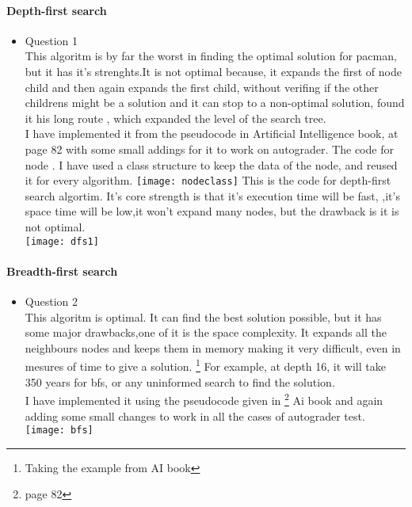 \newcommand\tab[1][1cm]{\hspace*{#1}}
\graphicspath{ {images/} }
\paragraph{Depth-first search}

\begin{itemize}
\item{Question 1}\\
	\tab This algoritm is by far the worst in finding the optimal solution for pacman, but it has it's strenghts.It is not optimal because, it expands the first of node child and then again expands the first child, without verifing if the other childrens might be a solution and it can stop to a non-optimal solution, found it his long route , which expanded the level of the search tree.\\
	\tab I have implemented it from the pseudocode in Artificial Intelligence book, at page 82 with some small addings for it to work on autograder. The code for node . I have used a class structure to keep the data of the node, and reused it for every algorithm.
\texttt{[image: nodeclass]}
	\tab This is the code for depth-first search algortim. It's core strength is that it's execution time will be fast, ,it's space time will be low,it won't expand many nodes, but the drawback is it is not optimal. \\
\texttt{[image: dfs1]}
\end{itemize}

\paragraph{Breadth-first search}
\begin{itemize}
\item{Question 2}\\
	\tab This algoritm is optimal. It can find the best solution possible, but it has some major drawbacks,one of it  is the space complexity. It expands all the neighbours nodes and keeps them in memory making it very difficult, even in mesures of time to give a solution. \footnote{Taking the example from AI book} For example, at depth 16, it will take 350 years for bfs, or any uninformed search to find the solution.\\
	\tab I have implemented it using the pseudocode given in \footnote{page 82} Ai book and again adding some small changes to work in all the cases of autograder test.\\
\texttt{[image: bfs]}
\end{itemize}

